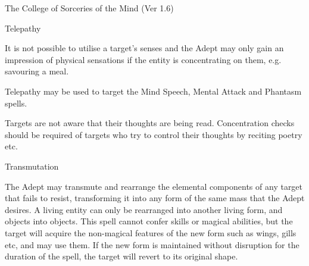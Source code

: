 \begin{Chapter}{The College of Sorceries of the Mind (Ver 1.6)}
\begin{spell}[S-9]{Telepathy }
\begin{effects}
It is not possible to utilise a target’s senses and the Adept may only
gain an impression of physical sensations if the entity is
concentrating on them, e.g. savouring a meal.

Telepathy may be used to target the Mind Speech, Mental Attack and
Phantasm spells.

Targets are not aware that their thoughts are being read.
Concentration checks should be required of targets who try to control
their thoughts by reciting poetry etc.
\end{effects}
\end{spell}

\begin{spell}[S-10]{Transmutation }

\begin{effects}
The Adept may transmute and rearrange the elemental components of any
target that fails to resist, transforming it into any form of the same
mass that the Adept desires.  A living entity can only be rearranged
into another living form, and objects into objects. This spell cannot
confer skills or magical abilities, but the target will acquire the
non-magical features of the new form such as wings, gills etc, and may
use them. If the new form is maintained without disruption for the
duration of the spell, the target will revert to its original shape.
\end{effects}
\end{spell}

\end{Chapter}
